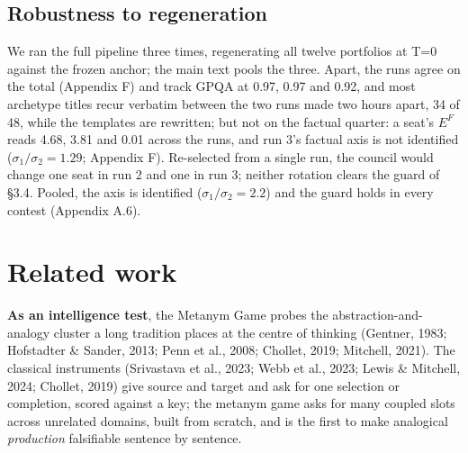 \documentclass{article}
\begin{document}
\subsection{Robustness to regeneration}\label{robustness-to-regeneration}

We ran the full pipeline three times, regenerating all twelve portfolios at T=0 against the frozen anchor; the main text pools the three. Apart, the runs agree on the total (Appendix F) and track GPQA at 0.97, 0.97 and 0.92, and most archetype titles recur verbatim between the two runs made two hours apart, 34 of 48, while the templates are rewritten; but not on the factual quarter: a seat's \(E^{F}\) reads 4.68, 3.81 and 0.01 across the runs, and run 3's factual axis is not identified (\(\sigma_1/\sigma_2 = 1.29\); Appendix F). Re-selected from a single run, the council would change one seat in run 2 and one in run 3; neither rotation clears the guard of \S{}3.4. Pooled, the axis is identified (\(\sigma_1/\sigma_2 = 2.2\)) and the guard holds in every contest (Appendix A.6).

\section{Related work}\label{related-work}

\textbf{As an intelligence test}, the Metanym Game probes the abstraction-and-analogy cluster a long tradition places at the centre of thinking (Gentner, 1983; Hofstadter \& Sander, 2013; Penn et al., 2008; Chollet, 2019; Mitchell, 2021). The classical instruments (Srivastava et al., 2023; Webb et al., 2023; Lewis \& Mitchell, 2024; Chollet, 2019) give source and target and ask for one selection or completion, scored against a key; the metanym game asks for many coupled slots across unrelated domains, built from scratch, and is the first to make analogical \emph{production} falsifiable sentence by sentence.
\end{document}

